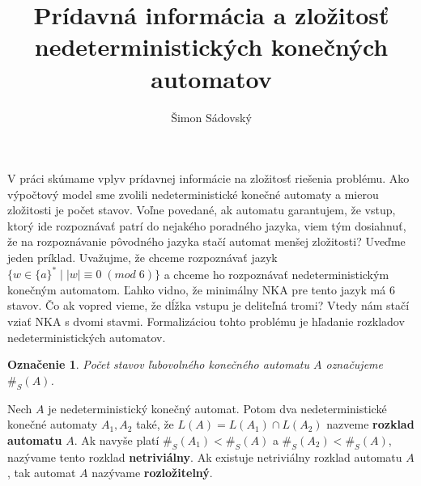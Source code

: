 \documentclass{svk_short_sk}
\newtheorem{notation}{Označenie}
\begin{document}
\title{Prídavná informácia a zložitosť nedeterministických konečných automatov}

\author{Šimon Sádovský
}




\maketitle

V práci skúmame vplyv prídavnej informácie na zložitosť riešenia problému. Ako
výpočtový model sme zvolili nedeterministické konečné automaty a mierou zložitosti je
počet stavov. Voľne povedané, ak automatu garantujem, že vstup, ktorý ide rozpoznávať patrí do nejakého poradného jazyka, viem tým dosiahnuť, že na rozpoznávanie pôvodného jazyka stačí automat menšej zložitosti? Uveďme jeden príklad. Uvažujme, že chceme rozpoznávať jazyk $ \lbrace w \in \lbrace a \rbrace^* \; | \; |w| \equiv 0 \; (mod \; 6) \rbrace $ a chceme ho rozpoznávať nedeterministickým konečným automatom. Ľahko vidno, že minimálny NKA pre tento jazyk má 6 stavov. Čo ak vopred vieme, že dĺžka vstupu je deliteľná tromi? Vtedy nám stačí vziať NKA s dvomi stavmi. Formalizáciou tohto problému je hľadanie rozkladov nedeterministických automatov.

\begin{notation}
Počet stavov ľubovolného konečného automatu $ A $ označujeme $ \#_S(A) $.
\end{notation}

\begin{definition}
Nech $ A $ je nedeterministický konečný automat. Potom dva nedeterministické konečné automaty $ A_1, A_2 $ také, že $ L(A)=L(A_1) \cap L(A_2) $ nazveme \textbf{rozklad automatu} $ A $. Ak navyše platí $ \#_S(A_1) < \#_S(A)$ a $ \#_S(A_2) < \#_S(A) $, nazývame tento rozklad \textbf{netriviálny}. Ak existuje netriviálny rozklad automatu $ A $, tak automat $ A $ nazývame \textbf{rozložitelný}.
\end{definition}
\end{document}

